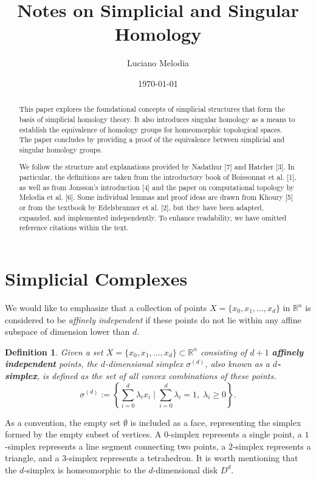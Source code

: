 \documentclass{amsart}
\title{Notes on Simplicial and Singular Homology}
\author[Luciano Melodia]{Luciano Melodia}
\date{\today}
\newtheorem{definition}{Definition}[section]
\begin{document}
\maketitle

\begin{abstract}
This paper explores the foundational concepts of simplicial structures that form the basis of simplicial homology theory. It also introduces singular homology as a means to establish the equivalence of homology groups for homeomorphic topological spaces. The paper concludes by providing a proof of the equivalence between simplicial and singular homology groups.

We follow the structure and explanations provided by Nadathur [7] and Hatcher [3]. In particular, the definitions are taken from the introductory book of Boissonnat et al. [1], as well as from Jonsson's introduction [4] and the paper on computational topology by Melodia et al. [6]. Some individual lemmas and proof ideas are drawn from Khoury [5] or from the textbook by Edelsbrunner et al. [2], but they have been adapted, expanded, and implemented independently. To enhance readability, we have omitted reference citations within the text.
\end{abstract}

\tableofcontents

\section{Simplicial Complexes}
We would like to emphasize that a collection of points $X = \{x_0, x_1, \ldots, x_d\}$ in $\mathbb{R}^n$ is considered to be \emph{affinely independent} if these points do not lie within any affine subspace of dimension lower than $d$.

\begin{definition}
Given a set $X = \{x_0, x_1, \ldots, x_d\} \subset \mathbb{R}^n$ consisting of $d+1$ \textbf{affinely independent} points, the $d$-dimensional simplex $\sigma^{(d)}$, also known as a \textbf{\emph{$d$-simplex}}, is defined as the set of all convex combinations of these points.
\begin{equation}
	\sigma^{(d)} := \left\{\sum_{i=0}^{d} \lambda_i x_i \; \vert \; \sum_{i=0}^{d} \lambda_i = 1, \; \lambda_i \geq 0 \right\}.
\end{equation}
\end{definition}

As a convention, the empty set $\emptyset$ is included as a face, representing the simplex formed by the empty subset of vertices. A $0$-simplex represents a single point, a $1$-simplex represents a line segment connecting two points, a $2$-simplex represents a triangle, and a $3$-simplex represents a tetrahedron. It is worth mentioning that the $d$-simplex is homeomorphic to the $d$-dimensional disk $D^d$.
\end{document}
